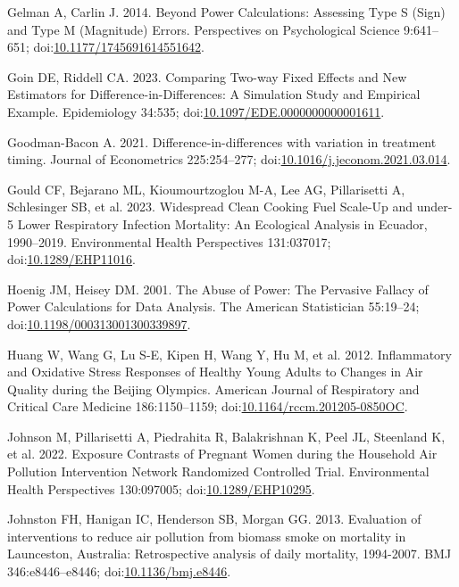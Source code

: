 \documentclass[
  letterpaper,
  DIV=11,
  numbers=noendperiod]{scrartcl}
\newlength{\cslhangindent}
\newenvironment{CSLReferences}[2] %
 {\begin{list}{}{%
  \setlength{\itemindent}{0pt}
  \setlength{\leftmargin}{0pt}
  \setlength{\parsep}{0pt}
  \ifodd #1
   \setlength{\leftmargin}{\cslhangindent}
   \setlength{\itemindent}{-1\cslhangindent}
  \fi
  \setlength{\itemsep}{#2\baselineskip}}}
 {\end{list}}
\begin{document}
\begin{CSLReferences}{1}{1}
Gelman A, Carlin J. 2014. Beyond {Power Calculations}: {Assessing Type
S} ({Sign}) and {Type M} ({Magnitude}) {Errors}. Perspectives on
Psychological Science 9:641--651;
doi:\href{https://doi.org/10.1177/1745691614551642}{10.1177/1745691614551642}.

Goin DE, Riddell CA. 2023. Comparing {Two-way Fixed Effects} and {New
Estimators} for {Difference-in-Differences}: {A Simulation Study} and
{Empirical Example}. Epidemiology 34:535;
doi:\href{https://doi.org/10.1097/EDE.0000000000001611}{10.1097/EDE.0000000000001611}.

Goodman-Bacon A. 2021. Difference-in-differences with variation in
treatment timing. Journal of Econometrics 225:254--277;
doi:\href{https://doi.org/10.1016/j.jeconom.2021.03.014}{10.1016/j.jeconom.2021.03.014}.

Gould CF, Bejarano ML, Kioumourtzoglou M-A, Lee AG, Pillarisetti A,
Schlesinger SB, et al. 2023. Widespread {Clean Cooking Fuel Scale-Up}
and under-5 {Lower Respiratory Infection Mortality}: {An Ecological
Analysis} in {Ecuador}, 1990--2019. Environmental Health Perspectives
131:037017;
doi:\href{https://doi.org/10.1289/EHP11016}{10.1289/EHP11016}.

Hoenig JM, Heisey DM. 2001. The {Abuse} of {Power}: {The Pervasive
Fallacy} of {Power Calculations} for {Data Analysis}. The American
Statistician 55:19--24;
doi:\href{https://doi.org/10.1198/000313001300339897}{10.1198/000313001300339897}.

Huang W, Wang G, Lu S-E, Kipen H, Wang Y, Hu M, et al. 2012.
Inflammatory and {Oxidative Stress Responses} of {Healthy Young Adults}
to {Changes} in {Air Quality} during the {Beijing Olympics}. American
Journal of Respiratory and Critical Care Medicine 186:1150--1159;
doi:\href{https://doi.org/10.1164/rccm.201205-0850OC}{10.1164/rccm.201205-0850OC}.

Johnson M, Pillarisetti A, Piedrahita R, Balakrishnan K, Peel JL,
Steenland K, et al. 2022. Exposure {Contrasts} of {Pregnant Women}
during the {Household Air Pollution Intervention Network Randomized
Controlled Trial}. Environmental Health Perspectives 130:097005;
doi:\href{https://doi.org/10.1289/EHP10295}{10.1289/EHP10295}.

Johnston FH, Hanigan IC, Henderson SB, Morgan GG. 2013. Evaluation of
interventions to reduce air pollution from biomass smoke on mortality in
{Launceston}, {Australia}: Retrospective analysis of daily mortality,
1994-2007. BMJ 346:e8446--e8446;
doi:\href{https://doi.org/10.1136/bmj.e8446}{10.1136/bmj.e8446}.


\end{CSLReferences}
\end{document}

